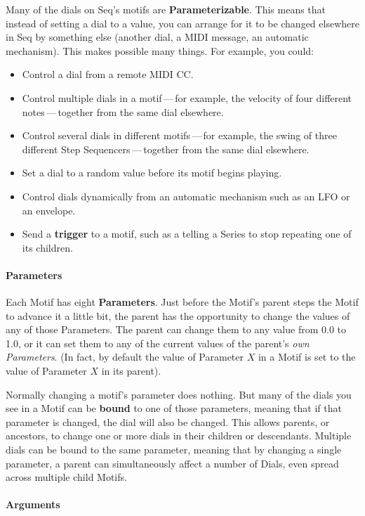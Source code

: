 \documentclass[twoside,10pt]{article}
\begin{document}
Many of the dials on Seq's motifs are {\bf Parameterizable}.  This means that instead of setting a dial to a value, you can arrange for it to be changed elsewhere in Seq by something else (another dial, a MIDI message, an automatic mechanism).  This makes possible many things.  For example, you could:

\begin{itemize}
\item Control a dial from a remote MIDI CC.
\item Control multiple dials in a motif\,---\,for example, the velocity of four different notes\,---\,together from the same dial elsewhere.
\item Control several dials in different motifs\,---\,for example, the swing of three different Step Sequencers\,---\,together from the same dial elsewhere.
\item Set a dial to a random value before its motif begins playing.
\item Control dials dynamically from an automatic mechanism such as an LFO or an envelope.
\item Send a {\bf trigger} to a motif, such as a telling a Series to stop repeating one of its children.
\end{itemize}


\paragraph{Parameters} Each Motif has eight {\bf Parameters}.   Just before the Motif's parent steps the Motif to advance it a little bit, the parent has the opportunity to change the values of any of those Parameters.  The parent can change them to any value from 0.0 to 1.0, or it can set them to any of the current values of the parent's {\it own Parameters}.  (In fact, by default the value of Parameter \(X\) in a Motif is set to the value of Parameter \(X\) in its parent).

Normally changing a motif's parameter does nothing.  But many of the dials you see in a Motif can be {\bf bound} to one of those parameters, meaning that if that parameter is changed, the dial will also be changed.  This allows parents, or ancestors, to change one or more dials in their children or descendants.  Multiple dials can be bound to the same parameter, meaning that by changing a single parameter, a parent can simultaneously affect a number of Dials, even spread across multiple child Motifs.

\paragraph{Arguments}
\end{document}
